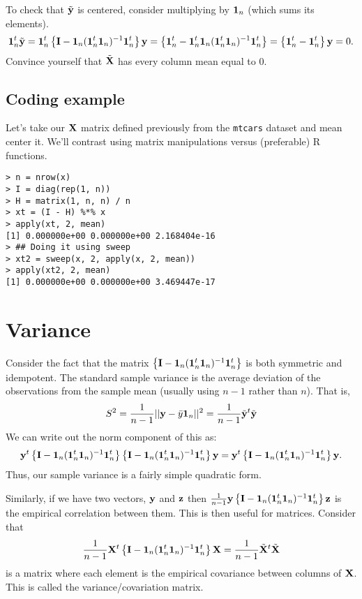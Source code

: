To check that $\tilde {\mathbf{y}}$ is centered, consider multiplying by $\mathbf{1}_n$ (which sums its elements). 
$$
\mathbf{1}_n^t \tilde {\mathbf{y}} = \mathbf{1}_n^t \left\{ \mathbf{I} - \mathbf{1}_n (\mathbf{1}_n^t \mathbf{1}_n)^{-1} \mathbf{1}_n^t \right\} \mathbf{y}
= \left\{ \mathbf{1}_n^t - \mathbf{1}_n^t \mathbf{1}_n (\mathbf{1}_n^t \mathbf{1}_n)^{-1} \mathbf{1}_n^t \right\} =
\left\{ \mathbf{1}_n^t - \mathbf{1}_n^t \right\}\mathbf{y} = 0.
$$
Convince yourself that $\tilde {\mathbf{X}}$ has every column mean equal to 0.

\subsection{Coding example}
Let's take our $\mathbf{X}$ matrix defined previously from the \texttt{mtcars} dataset and
mean center it. We'll contrast using matrix manipulations versus (preferable)
R functions. 

\begin{verbatim}
> n = nrow(x)
> I = diag(rep(1, n))
> H = matrix(1, n, n) / n
> xt = (I - H) %*% x 
> apply(xt, 2, mean)
[1] 0.000000e+00 0.000000e+00 2.168404e-16
> ## Doing it using sweep
> xt2 = sweep(x, 2, apply(x, 2, mean))
> apply(xt2, 2, mean)
[1] 0.000000e+00 0.000000e+00 3.469447e-17
\end{verbatim}


\section{Variance}
Consider the fact that the matrix $\left\{ \mathbf{I} - \mathbf{1}_n (\mathbf{1}_n^t \mathbf{1}_n)^{-1} \mathbf{1}_n^t \right\}$
is both symmetric and idempotent. The standard sample variance is the average deviation of the
observations from the sample mean (usually using $n-1$ rather than $n$). That is,
$$
S^2 = \frac{1}{n-1}|| \mathbf{y} - \bar y \mathbf{1}_n ||^2 = \frac{1}{n-1} \tilde {\mathbf{y}}^t \tilde {\mathbf{y}}
$$
We can write out the norm component of this as: 
$$
\mathbf{y}^t \left\{ \mathbf{I} - \mathbf{1}_n (\mathbf{1}_n^t \mathbf{1}_n)^{-1} \mathbf{1}_n^t \right\}
\left\{ \mathbf{I} - \mathbf{1}_n (\mathbf{1}_n^t \mathbf{1}_n)^{-1} \mathbf{1}_n^t \right\} \mathbf{y}
= \mathbf{y}^t \left\{ \mathbf{I} - \mathbf{1}_n (\mathbf{1}_n^t \mathbf{1}_n)^{-1} \mathbf{1}_n^t \right\}\mathbf{y}.
$$
Thus, our sample variance is a fairly simple quadratic form. 

Similarly, if we have two vectors, $\mathbf{y}$ and $\mathbf{z}$ then $\frac{1}{n-1}\mathbf{y} \left\{ \mathbf{I} - \mathbf{1}_n (\mathbf{1}_n^t \mathbf{1}_n)^{-1} \mathbf{1}_n^t \right\} \mathbf{z}$ is the
empirical correlation between them.
This is then useful for matrices. Consider that
$$
\frac{1}{n-1} \mathbf{X}^t \left\{ \mathbf{I} - \mathbf{1}_n (\mathbf{1}_n^t \mathbf{1}_n)^{-1} \mathbf{1}_n^t \right\} \mathbf{X}
= \frac{1}{n-1} \tilde {\mathbf{X}}^t \tilde {\mathbf{X}}
$$
is a matrix where each element is the empirical covariance between columns of $\mathbf{X}$.
This is called the variance/covariation matrix. 

